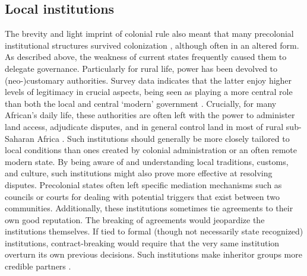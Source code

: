 \subsection{Local institutions} \label{Local institutions}

The brevity and light imprint of colonial rule also meant that many precolonial
institutional structures survived colonization \citep{Wig2016, Wig2018},
although often in an altered form. As described above, the weakness of current
states frequently caused them to delegate governance. Particularly for rural
life, power has been devolved to (neo-)customary authorities. Survey data
indicates that the latter enjoy higher levels of legitimacy in crucial aspects,
being seen as playing a more central role than both the local and central
`modern' government \citep[360]{Logan_2013}. Crucially, for many African's daily
life, these authorities are often left with the power to administer land access,
adjudicate disputes, and in general control land in most of rural sub-Saharan
Africa \citep{englebert2013inside, boone2014property, posner2005institutions}.
Such institutions should generally be more closely tailored to local conditions
than ones created by colonial administration or an often remote modern state. By
being aware of and understanding local traditions, customs, and culture, such
institutions might also prove more effective at resolving disputes. Precolonial
states often left specific mediation mechanisms such as councils or courts for
dealing with potential triggers that exist between two communities.
Additionally, these institutions sometimes tie agreements to their own good
reputation. The breaking of agreements would jeopardize the institutions
themselves. If tied to formal (though not necessarily state recognized)
institutions, contract-breaking would require that the very same institution
overturn its own previous decisions. Such institutions make inheritor groups
more credible partners \citep{Wig2018}. 


